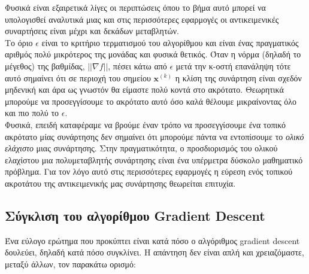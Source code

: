 \documentclass[11pt]{article} %
\numberwithin{equation}{subsection}
\begin{document}
Φυσικά είναι εξαιρετικά λίγες οι περιπτώσεις όπου το βήμα αυτό μπορεί να υπολογισθεί αναλυτικά μιας και στις περισσότερες εφαρμογές οι αντικειμενικές συναρτήσεις είναι μέχρι και δεκάδων μεταβλητών.\\

Το όριο $\epsilon$ είναι το κριτήριο τερματισμού του αλγορίθμου και είναι ένας πραγματικός αριθμός πολύ μικρότερος της μονάδας και φυσικά θετικός. Όταν η νόρμα (δηλαδή το μέγεθος) της βαθμίδας, $||\nabla f||$, πέσει κάτω από $\epsilon$ μετά την κ-οστή επανάληψη τότε αυτό σημαίνει ότι σε περιοχή του σημείου $\textbf{x}^{(k)}$ η κλίση της συνάρτηση είναι σχεδόν μηδενική και άρα ως γνωστόν θα είμαστε πολύ κοντά στο ακρότατο. Θεωρητικά μπορούμε να προσεγγίσουμε το ακρότατο αυτό όσο καλά θέλουμε μικραίνοντας όλο και πιο πολύ το $\epsilon$.\\

Φυσικά, επειδή καταφέραμε να βρούμε έναν τρόπο να προσεγγίσουμε ένα τοπικό ακρότατο μίας συνάρτησης δεν σημαίνει ότι μπορούμε πάντα να εντοπίσουμε το \textit{ολικό ελάχιστο} μιας συνάρτησης. Στην πραγματικότητα, ο προσδιορισμός του ολικού ελαχίστου μια πολυμεταβλητής συνάρτησης είναι ένα υπέρμετρα δύσκολο μαθηματικό πρόβλημα. Για τον λόγο αυτό στις περισσότερες εφαρμογές η εύρεση ενός τοπικού ακροτάτου της αντικειμενικής μας συνάρτησης θεωρείται επιτυχία. \\

\subsection{Σύγκλιση του αλγορίθμου Gradient Descent}
Ένα εύλογο ερώτημα που προκύπτει είναι κατά πόσο ο αλγόριθμος gradient descent δουλεύει, δηλαδή κατά πόσο συγκλίνει. Η απάντηση δεν είναι απλή και χρειαζόμαστε, μεταξύ άλλων, τον παρακάτω ορισμό:\\
\end{document}
